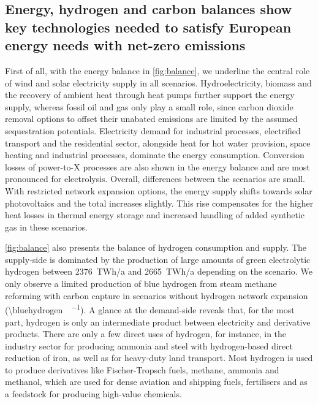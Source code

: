 \subsection*{Energy, hydrogen and carbon balances show key technologies needed to satisfy European energy needs with net-zero emissions}
\label{sec:balances}

First of all, with the energy balance in \cref{fig:balance}, we underline the
central role of wind and solar electricity supply in all scenarios.
Hydroelectricity, biomass and the recovery of ambient heat through heat pumps
further support the energy supply, whereas fossil oil and gas only play a small
role, since carbon dioxide removal options to offset their unabated emissions
are limited by the assumed sequestration potentials. Electricity demand for
industrial processes, electrified transport and the residential sector,
alongside heat for hot water provision, space heating and industrial processes,
dominate the energy consumption. Conversion losses of power-to-X processes are
also shown in the energy balance and are most pronounced for electrolysis.
Overall, differences between the scenarios are small. With restricted network
expansion options, the energy supply shifts towards solar photovoltaics and the
total increases slightly. This rise compensates for the higher heat losses in
thermal energy storage and increased handling of added synthetic gas in these
scenarios.

\cref{fig:balance} also presents the balance of hydrogen consumption and supply.
The supply-side is dominated by the production of large amounts of green
electrolytic hydrogen between 2376~TWh/a and 2665~TWh/a depending on the
scenario. We only observe a limited production of blue hydrogen from steam
methane reforming with carbon capture in scenarios without hydrogen network
expansion (\SI{\bluehydrogen}{\twh\per\year}). A glance at the demand-side
reveals that, for the most part, hydrogen is only an intermediate product
between electricity and derivative products. There are only a few direct uses of
hydrogen, for instance, in the industry sector for producing ammonia and steel
with hydrogen-based direct reduction of iron, as well as for heavy-duty land
transport. Most hydrogen is used to produce derivatives like Fischer-Tropsch
fuels, methane, ammonia and methanol, which are used for dense aviation and
shipping fuels, fertilisers and as a feedstock for producing high-value
chemicals.

